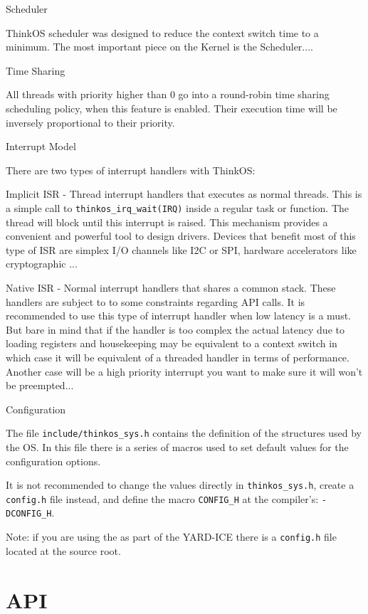 Scheduler

ThinkOS scheduler was designed to reduce the context switch time to a minimum. The most important piece on the Kernel is the Scheduler....

Time Sharing

All threads with priority higher than 0 go into a round-robin time sharing scheduling policy, when this feature is enabled. Their execution time will be inversely proportional to their priority.

Interrupt Model

There are two types of interrupt handlers with ThinkOS:

Implicit ISR - Thread interrupt handlers that executes as normal threads. This is a simple call to \lstinline{thinkos_irq_wait(IRQ)} inside a regular task or function. The thread will block until this interrupt is raised. This mechanism provides a convenient and powerful tool to design drivers. Devices that benefit most of this type of ISR are simplex I/O channels like I2C or SPI, hardware accelerators like cryptographic ...

Native ISR - Normal interrupt handlers that shares a common stack. These handlers are subject to to some constraints regarding API calls. It is recommended to use this type of interrupt handler when low latency is a must. But bare in mind that if the handler is too complex the actual latency due to loading registers and housekeeping may be equivalent to a context switch in which case it will be equivalent of a threaded handler in terms of performance. Another case will be a high priority interrupt you want to make sure it will won't be preempted...

Configuration

The file \lstinline{include/thinkos_sys.h} contains the definition of the structures used by the OS. In this file there is a series of macros used to set default values for the configuration options.

It is not recommended to change the values directly in \lstinline{thinkos_sys.h}, create a \lstinline{config.h} file instead, and define the macro \lstinline{CONFIG_H} at the compiler's: \lstinline{-DCONFIG_H}.

Note: if you are using the \ThinkOS as part of the YARD-ICE there is a \lstinline{config.h} file located at the source root.


\section {API}

